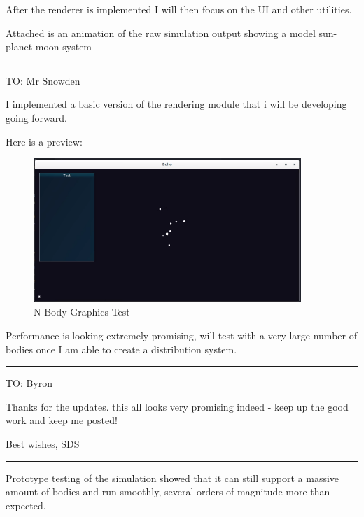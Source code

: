 {After the renderer is implemented I will then focus on the UI and other utilities.

Attached is an animation of the raw simulation output showing a model sun-planet-moon system

\vspace{8pt}
\hrule

TO: Mr Snowden

I implemented a basic version of the rendering module that i will be developing going forward.

Here is a preview:

\begin{figure}[H]
  \centering
  \includegraphics[width=0.9\textwidth]{img/pEcho.png}
  \caption{N-Body Graphics Test}
\end{figure}

Performance is looking extremely promising, will test with a very large number of bodies once I am able to create a distribution system.

\vspace{8pt}
\pagebreak
\hrule

TO: Byron

Thanks for the updates. this all looks very promising indeed - keep up the good work and keep me posted!

Best wishes,
SDS

\vspace{8pt}
\hrule

Prototype testing of the simulation showed that it can still support a massive amount of bodies and run smoothly, several orders of magnitude more than expected.

}
